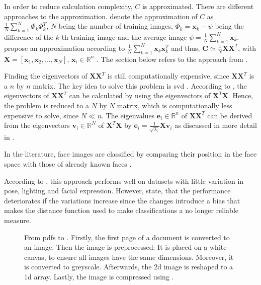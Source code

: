 
In order to reduce calculation complexity, $C$ is approximated.
There are different approaches to the approximation.
\citeauthor{eigenfaces1991} \cite{eigenfaces1991} denote the approximation of $C$ as 
$\frac{1}{N}\sum_{k=1}^{N}\Phi_{k}\Phi_{k}^{T}$, $N$ being the number of training images, $\Phi_{k} = \mathbf{x}_{k} - {\psi }$ 
being the difference of the $k$-th training image and the average image $\psi = \frac{1}{N}\sum_{k=1}^{N}\textbf{x}_{k}$.
\citeauthor{eigenfaces1997} propose an approximation according to $\frac{1}{N}\sum_{k=1}^{N}\textbf{x}_{k}\textbf{x}_{k}^{T}$ and thus, $\textbf{C} \simeq \frac{1}{N}\textbf{X}\textbf{X}^{T}$, 
with $\textbf{X} = \left[ \textbf{x}_{1}, \textbf{x}_{2}, ..., \textbf{x}_{N} \right]$, $\textbf{x}_i \in \mathbb{R}^{n}$ \cite{eigenfaces1997}.
The section below refers to the approach from \citeauthor{eigenfaces1997}.

Finding the eigenvectors of $\textbf{X}\textbf{X}^{T}$ is still computationally expensive, since $\textbf{X}\textbf{X}^{T}$ is a $n$ by $n$ matrix.
The key idea to solve this problem is \ac{svd} \cite{eigenfaces1997}.
According to \citeauthor{eigenfaces1997}, the eigenvectors of $\textbf{X}\textbf{X}^{T}$ can be calculated by using the eigenvectors of $\textbf{X}^{T}\textbf{X}$.
Hence, the problem is reduced to a $N$ by $N$ matrix, which is computationally less expensive to solve, since $N \ll n$.
The eigenvalues $\textbf{e}_i \in \mathbb{R}^{n}$ of $\textbf{X}\textbf{X}^{T}$ can be derived from the eigenvectors $\textbf{v}_i \in \mathbb{R}^{N}$ of $\textbf{X}^{T}\textbf{X}$ by 
$\textbf{e}_i = \frac{1}{\sqrt{\lambda_i}}\textbf{X}\textbf{v}_i$ as discussed in more detail in \cite{eigenfaces1997}.

In the literature, face images are classified by comparing their position in the face space with those of already known faces \cite{eigenfaces1991}.


According to \cite{eigenfaces1991}, this approach performs well on datasets with little variation in pose, lighting and facial expression.
However,  state, that the performance deteriorates if the variations increase since the changes introduce a bias 
that makes the distance function used to make classifications a no longer reliable measure.

\begin{figure}[htp] %
    \centering
    
    \caption{From \acp{pdf} to \eigendocs{}.
    Firstly, the first page of a document is converted to an image.
    Then the image is preprocessed:
    It is placed on a white canvas, to ensure all images have the same dimensions.
    Moreover, it is converted to greyscale.
    Afterwards, the 2d image is reshaped to a 1d array.
    Lastly, the image is compressed using \eigenfaces{}.
    }
    \label{fig:eigendocs_procedure}
\end{figure}

